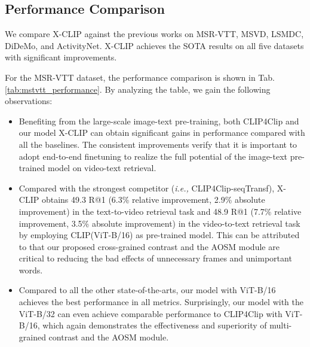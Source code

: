 \documentclass[sigconf]{acmart}
\begin{document}
\subsection{Performance Comparison}
We compare X-CLIP against the previous works on MSR-VTT, MSVD, LSMDC, DiDeMo, and ActivityNet. X-CLIP achieves the SOTA results on all five datasets with significant improvements.  


For the MSR-VTT dataset, the performance comparison is shown in Tab. \ref{tab:mstvtt_performance}. By analyzing the table, we gain the following observations:

\begin{itemize}[leftmargin=*]
    \item Benefiting from the large-scale image-text pre-training, both CLIP4Clip and our model X-CLIP can obtain significant gains in performance compared with all the baselines. The consistent improvements verify that it is important to adopt end-to-end finetuning to realize the full potential of the image-text pre-trained model on video-text retrieval.
    
    \item Compared with the strongest competitor (\emph{i.e.,} CLIP4Clip-seqTransf), X-CLIP obtains 49.3 R@1 (6.3\% relative improvement, 2.9\% absolute improvement) in the text-to-video retrieval task and 48.9 R@1 (7.7\% relative improvement, 3.5\% absolute improvement) in the video-to-text retrieval task by employing CLIP(ViT-B/16) as pre-trained model. This can be attributed to that our proposed cross-grained contrast and the AOSM module are critical to reducing the bad effects of unnecessary frames and unimportant words.

    \item Compared to all the other state-of-the-arts, our model with ViT-B/16 achieves the best performance in all metrics. Surprisingly, our model with the ViT-B/32 can even achieve comparable performance to CLIP4Clip with ViT-B/16, which again demonstrates the effectiveness and superiority of multi-grained contrast and the AOSM module.
\end{itemize}
\end{document}
